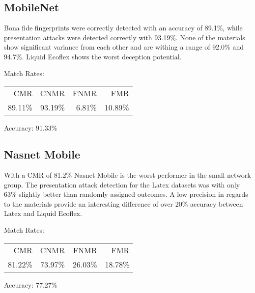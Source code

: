 \subsection{MobileNet}
\begin{minipage}[c]{0.7\textwidth}
    Bona fide fingerprints were correctly detected with an accuracy of 89.1\%, while presentation attacks were detected correctly with 93.19\%.
    None of the materials show significant variance from each other and are withing a range of 92.0\% and 94.7\%.
    Liquid Ecoflex shows the worst deception potential.

    \medskip\centering Match Rates: 
    \begin{tabular}{ r  r  r  r |}
        CMR     & CNMR          & FNMR                 & FMR    \\
        89.11\% & 93.19\%       & 6.81\%               & 10.89\% \\
    \end{tabular} \hspace{2mm} Accuracy: 91.33\%
\end{minipage}
\hfill
\begin{minipage}[c]{0.3\textwidth}
    \centering
    
\end{minipage}



\subsection{Nasnet Mobile}
\begin{minipage}[c]{0.7\textwidth}

    With a CMR of 81.2\% Nasnet Mobile is the worst performer in the small network group.
    The presentation attack detection for the Latex datasets was with only 63\% slightly better than randomly assigned outcomes.
    A low precision in regards to the materials provide an interesting difference of over 20\% accuracy between Latex and Liquid Ecoflex.

    \medskip\centering Match Rates: 
    \begin{tabular}{ r  r  r  r |}
        CMR     & CNMR          & FNMR                 & FMR     \\
        81.22\% & 73.97\%       & 26.03\%              & 18.78\%  \\
    \end{tabular} \hspace{2mm} Accuracy: 77.27\%
\end{minipage}
\hfill
\begin{minipage}[c]{0.3\textwidth}
    \centering
    
\end{minipage}



